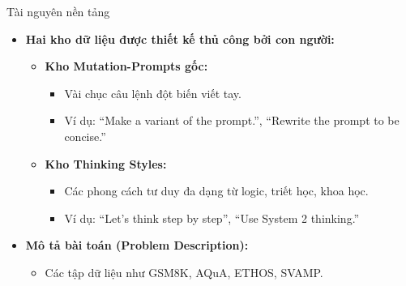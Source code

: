 \documentclass[english,main=vietnamese,xcolor=table]{beamer}
\begin{document}
\begin{frame}{Tài nguyên nền tảng}

\begin{itemize}
    \setlength{\itemsep}{8pt}

    \item \textbf{Hai kho dữ liệu được thiết kế thủ công bởi con người:}
    \begin{itemize}
        \item \textbf{Kho Mutation-Prompts gốc:} 
        \begin{itemize}
            \item Vài chục câu lệnh đột biến viết tay.
            \item Ví dụ: “Make a variant of the prompt.”, “Rewrite the prompt to be concise.”
        \end{itemize}
        \item \textbf{Kho Thinking Styles:}
        \begin{itemize}
            \item Các phong cách tư duy đa dạng từ logic, triết học, khoa học.
            \item Ví dụ: “Let’s think step by step”, “Use System 2 thinking.”
        \end{itemize}
    \end{itemize}

    \item \textbf{Mô tả bài toán (Problem Description):}
    \begin{itemize}
        \item Các tập dữ liệu như GSM8K, AQuA, ETHOS, SVAMP.
    \end{itemize}

\end{itemize}

\end{frame}
\end{document}

